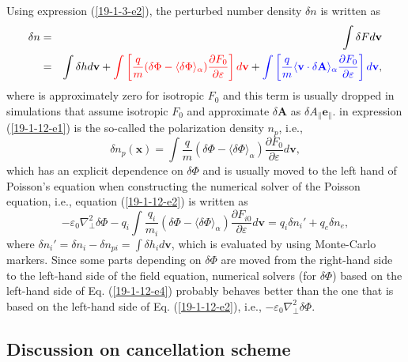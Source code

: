 \documentclass{article}
\newcommand{\tmcolor}[2]{{\color{#1}{#2}}}
\begin{document}
Using expression (\ref{19-1-3-e2}), the perturbed number density $\delta n$ is
written as
\begin{eqnarray}
  \delta n & = & \int \delta F d\mathbf{v} \nonumber\\
  & = & \int \delta h d\mathbf{v}+ \tmcolor{red}{\int \left[ \frac{q}{m}
  (\delta \Phi - \langle \delta \Phi \rangle_{\alpha}) \frac{\partial
  F_0}{\partial \varepsilon} \right] d\mathbf{v}} + \tmcolor{blue}{\int \left[
  \frac{q}{m} \langle \mathbf{v} \cdot \delta \mathbf{A} \rangle_{\alpha}
  \frac{\partial F_0}{\partial \varepsilon} \right] d\mathbf{v}}, 
  \label{19-1-12-e1}
\end{eqnarray}
where \tmcolor{blue}{the blue term} is approximately zero for isotropic $F_0$
and this term is usually dropped in simulations that assume isotropic $F_0$
and approximate $\delta \mathbf{A}$ as $\delta A_{\parallel}
\mathbf{e}_{\parallel}$. \tmcolor{red}{The red term} in expression
(\ref{19-1-12-e1}) is the so-called the polarization density $n_p$, i.e.,
\begin{equation}
  \label{18-9-13-p9} \delta n_p (\mathbf{x}) = \int \frac{q }{m} (\delta \Phi
  - \langle \delta \Phi \rangle_{\alpha}) \frac{\partial F_0}{\partial
  \varepsilon} d\mathbf{v},
\end{equation}
which has an explicit dependence on $\delta \Phi$ and is usually moved to the
left hand of Poisson's equation when constructing the numerical solver of the
Poisson equation, i.e., equation (\ref{19-1-12-e2}) is written as
\begin{equation}
  \label{19-1-12-e4} - \varepsilon_0 \nabla^2_{\perp} \delta \Phi - q_i \int
  \frac{q_i}{m_i} (\delta \Phi - \langle \delta \Phi \rangle_{\alpha})
  \frac{\partial F_{i 0}}{\partial \varepsilon} d\mathbf{v}= q_i \delta n_i' +
  q_e \delta n_e,
\end{equation}
where $\delta n_i' = \delta n_i - \delta n_{p i} = \int \delta h_i
d\mathbf{v}$, which is evaluated by using Monte-Carlo markers. Since some
parts depending on $\delta \Phi$ are moved from the right-hand side to the
left-hand side of the field equation, numerical solvers (for $\delta \Phi$)
based on the left-hand side of Eq. (\ref{19-1-12-e4}) probably behaves better
than the one that is based on the left-hand side of Eq. (\ref{19-1-12-e2}),
i.e., $- \varepsilon_0 \nabla^2_{\perp} \delta \Phi$.

\subsection{Discussion on cancellation scheme}
\end{document}
